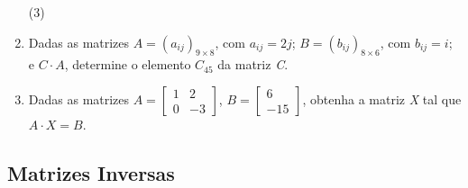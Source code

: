 \begin{enumerate}[label*=\protect\fbox{\arabic{enumi}}]
{	                  \begin{tasks}(3)
	                  \end{tasks}
	            }

	\item {
	      Dadas as matrizes $A = (a_{ij})_{9 \times 8}$, com $a_{ij} = 2j$; $B = (b_{ij})_{8 \times 6}$, com $b_{ij} = i$; e $C \cdot A$,
	      determine o elemento $C_{45}$ da matriz \textit{C}.
	      }

	\item {
	      Dadas as matrizes $A = \begin{bmatrix}
			      1 & 2  \\
			      0 & -3
		      \end{bmatrix}$, $B = \begin{bmatrix}
			      6 \\
			      -15
		      \end{bmatrix}$, obtenha a matriz \textit{X} tal que $A \cdot X = B$.
	      }
\end{enumerate}

\subsection{Matrizes Inversas}


